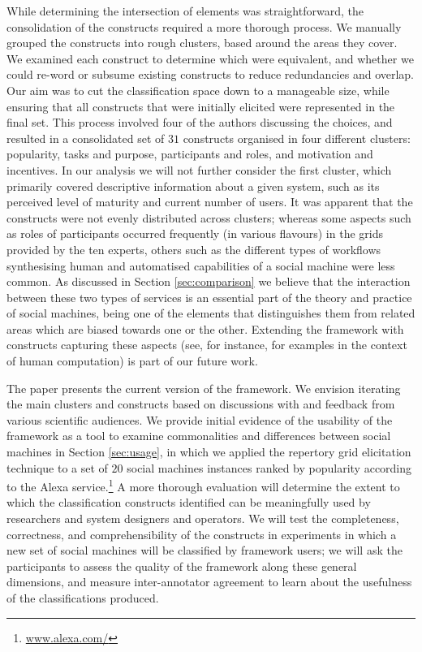 \documentclass{www13-companion-accepted}
\begin{document}
While determining the intersection of elements was straightforward, the consolidation of the
constructs required a more thorough process. We manually grouped the constructs into rough clusters, based around the areas they cover. We examined each construct to determine which were equivalent, and whether we could re-word or subsume existing constructs to reduce redundancies and overlap. Our aim was to cut the classification space down to a manageable size, while ensuring that all constructs that were initially elicited were represented in the final set. This process involved four of the authors discussing the choices, and resulted in a consolidated set of $31$ constructs organised in four different clusters: popularity, tasks and purpose, participants and roles, and motivation and incentives. In our analysis we will not further consider the first cluster, which primarily covered descriptive information about a given system, such as its perceived level of maturity and current number of users. It was apparent that the constructs were not evenly distributed across clusters; whereas some aspects such as roles of participants occurred frequently (in various flavours) in the grids provided by the ten experts, others such as the different types of workflows synthesising human and automatised capabilities of a social machine were less common. As discussed in Section \ref{sec:comparison} we believe that the interaction between these two types of services is an essential part of the theory and practice of social machines, being one of the elements that distinguishes them from related areas which are biased towards one or the other. Extending the framework with constructs capturing these aspects (see, for instance, \cite{quinn2011human} for examples in the context of human computation) is part of our future work.

The paper presents the current version of the framework. We envision iterating the main clusters and constructs based on discussions with and feedback from various scientific audiences. We provide initial evidence of the usability of the framework as a tool to examine commonalities and differences between social machines in Section \ref{sec:usage}, in which we applied the repertory grid elicitation technique to a set of $20$ social machines instances ranked by popularity according to the Alexa service.\footnote{\url{www.alexa.com/}} A more thorough evaluation will determine the extent to which the classification constructs identified can be meaningfully used by researchers and system designers and operators. We will test the completeness, correctness, and comprehensibility of the constructs in experiments in which a new set of social machines will be classified by framework users; we will ask the participants to assess the quality of the framework along these general dimensions, and measure inter-annotator agreement to learn about the usefulness of the classifications produced.
\end{document}

